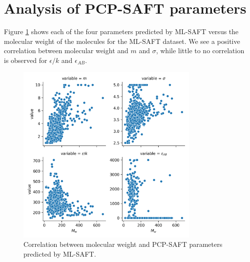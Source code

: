 \appendix

\section{Analysis of PCP-SAFT parameters}\label{app:sensitivity}





Figure \ref{fig:molecular_weight} shows each of the four parameters predicted by ML-SAFT versus the molecular weight of the molecules for the ML-SAFT dataset. We see a positive correlation between molecular weight and $m$ and $\sigma$, while little to no correlation is observed for $\epsilon/k$ and $\epsilon_{AB}$.

\begin{figure}
    \centering
    \includegraphics[width=0.8\textwidth]{gfx/Chapter07/mw_pcsaft_parameter_correlation.png}
    \caption{Correlation between molecular weight and PCP-SAFT parameters predicted by ML-SAFT.}
    \label{fig:molecular_weight}
\end{figure}

